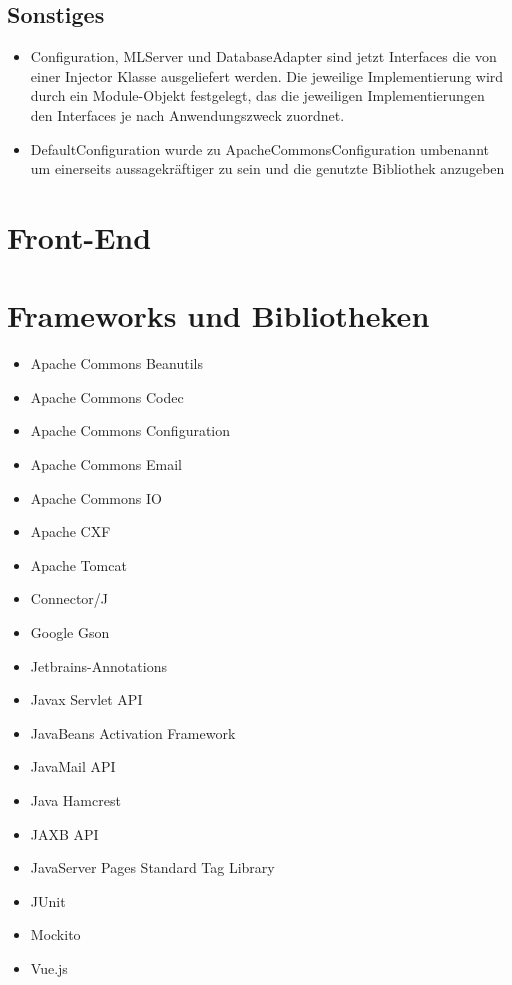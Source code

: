 \documentclass[a4paper]{scrreprt}
\begin{document}
\section{Sonstiges}
\begin{itemize}
    \item Configuration, MLServer und DatabaseAdapter sind jetzt Interfaces die von einer Injector Klasse ausgeliefert werden.
    Die jeweilige Implementierung wird durch ein Module-Objekt festgelegt, das die jeweiligen Implementierungen den Interfaces je nach Anwendungszweck zuordnet.
    \item DefaultConfiguration wurde zu ApacheCommonsConfiguration umbenannt um einerseits aussagekräftiger zu sein und die genutzte Bibliothek anzugeben
\end{itemize}

\chapter{Front-End}

\chapter{Frameworks und Bibliotheken}
\begin{itemize}
    \item Apache Commons Beanutils
    \item Apache Commons Codec
    \item Apache Commons Configuration
    \item Apache Commons Email
    \item Apache Commons IO
    \item Apache CXF
    \item Apache Tomcat
    \item Connector/J
    \item Google Gson
    \item Jetbrains-Annotations
    \item Javax Servlet API
    \item JavaBeans Activation Framework
    \item JavaMail API
    \item Java Hamcrest
    \item JAXB API
    \item JavaServer Pages Standard Tag Library
    \item JUnit
    \item Mockito
    \item Vue.js
\end{itemize}
\end{document}
